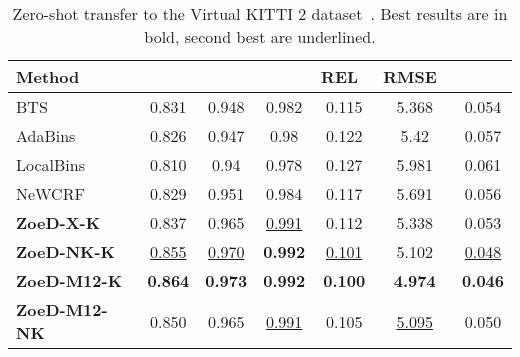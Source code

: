 \documentclass[10pt,twocolumn,letterpaper]{article}
\begin{document}
  
\begin{table}[htb]
\centering
\setlength{\tabcolsep}{3pt} \small
\begin{tabular}{@{}lcccccc@{}}
\toprule
Method &  &  &  & REL~ & RMSE~ & \\ \midrule
BTS~\cite{bts_lee2019big}               & 0.831 & 0.948 & 0.982 &     0.115 &  5.368 &    0.054   \\ 
AdaBins~\cite{bhat2021adabins}          & 0.826 & 0.947 & 0.98  &     0.122 &  5.42  &    0.057    \\ 
LocalBins~\cite{bhat2022localbins}      & 0.810  & 0.94  & 0.978 &     0.127 &  5.981 &    0.061    \\
NeWCRF~\cite{yuan2022new}               & 0.829 & 0.951 & 0.984 &     0.117 &  5.691 &    0.056     \\ 
\midrule
\textbf{ZoeD-X-K}       & 0.837 & 0.965 & \underline{0.991} &     0.112 &  5.338 &    0.053 \\ 
\textbf{ZoeD-NK-K}      & \underline{0.855} & \underline{0.970}  & \textbf{0.992} &     \underline{0.101} &  {5.102} &    \underline{0.048} \\
\textbf{ZoeD-M12-K}     & \textbf{0.864} & \textbf{0.973} & \textbf{0.992} &     \textbf{0.100}   &  \textbf{4.974} &    \textbf{0.046} \\
\textbf{ZoeD-M12-NK}    & 0.850 & 0.965 & \underline{0.991} & 0.105 & \underline{5.095} & 0.050 \\
\bottomrule
\end{tabular}
\caption{Zero-shot transfer to the Virtual KITTI 2 dataset~\cite{cabon2020vkitti2}. Best results are in bold, second best are underlined.}
\label{tab:vkitti2-full}
\end{table}
\end{document}
